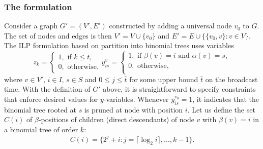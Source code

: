 \subsubsection{The formulation}
Consider a graph $G'=(V',E')$ constructed  by adding a universal node $v_0$ to $G$.
The set of nodes and edges is then $V'=V\cup \{v_0\}$ and $E'=E\cup\{\{v_0,v\}:v\in V\}$.
The ILP formulation based on partition into binomial trees uses variables
$$
z_{k}=
\begin{cases}
1, \text{ if } k\leq t,\\
0, \text{ otherwise}.
\end{cases}
y_{is}^v=
\begin{cases}
1, \text{ if } \beta(v)=i \text{ and } \alpha(v)=s,\\
0, \text{ otherwise},\\
\end{cases}
$$
where $v\in V'$, $i\in I$, $s\in S$ and $0\leq j\leq \bar{t}$ for some upper bound $\bar{t}$ on the broadcast time.
With the definition of $G'$ above, it is straightforward to specify constraints that enforce desired values for $y$-variables.
Whenever $y_{is}^{v_0}=1$, it indicates that the binomial tree rooted at $s$ is pruned at node with position $i$.
Let us define the set $C(i)$ of $\beta$-positions of children (direct descendants) of node $v$ with $\beta(v)=i$ in a binomial tree of order $k$:
\begin{equation}
\label{eq:c1}
C(i)=\{2^j+i:j=\lceil\log_2 i\rceil,\dots,k-1\}.
\end{equation}
